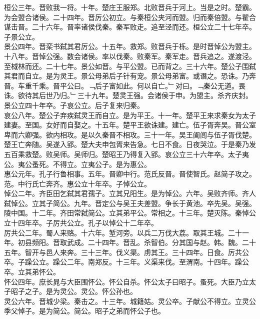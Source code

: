 \documentclass{zhvt-classic}
\begin{document}
\hspace*{2em}桓公三年。晋败我一将。十年。楚庄王服郑。北败晋兵于河上。当是之时。楚霸。为会盟合诸侯。二十四年。晋厉公初立。与秦桓公夹河而盟。归而秦倍盟。与翟合谋击晋。二十六年。晋率诸侯伐秦。秦军败走。追至泾而还。桓公立二十七年卒。子景公立。\\
\hspace*{2em}景公四年。晋栾书弑其君厉公。十五年。救郑。败晋兵于栎。是时晋悼公为盟主。十八年。晋悼公强。数会诸侯。率以伐秦。败秦军。秦军走。晋兵追之。遂渡泾。至棫林而还。二十七年。景公如晋。与平公盟。已而背之。三十六年。楚公子围弑其君而自立。是为灵王。景公母弟后子针有宠。景公母弟富。或谮之。恐诛。乃奔晋。车重千乘。晋平公曰。﹁后子富如此。何以自亡。﹂对曰。﹁秦公无道。畏诛。欲待其后世乃归。﹂三十九年。楚灵王强。会诸侯于申。为盟主。杀齐庆封。景公立四十年卒。子哀公立。后子复来归秦。\\
\hspace*{2em}哀公八年。楚公子弃疾弑灵王而自立。是为平王。十一年。楚平王来求秦女为太子建妻。至国。女好而自娶之。十五年。楚平王欲诛建。建亡。伍子胥奔吴。晋公室卑而六卿强。欲内相攻。是以久秦晋不相攻。三十一年。吴王阖闾与伍子胥伐楚。楚王亡奔随。吴遂入郢。楚大夫申包胥来告急。七日不食。日夜哭泣。于是秦乃发五百乘救楚。败吴师。吴师归。楚昭王乃得复入郢。哀公立三十六年卒。太子夷公。夷公蚤死。不得立。立夷公子。是为惠公。\\
\hspace*{2em}惠公元年。孔子行鲁相事。五年。晋卿中行。范氏反晋。晋使智氏。赵简子攻之。范。中行氏亡奔齐。惠公立十年卒。子悼公立。\\
\hspace*{2em}悼公二年。齐臣田乞弑其君孺子。立其兄阳生。是为悼公。六年。吴败齐师。齐人弑悼公。立其子简公。九年。晋定公与吴王夫差盟。争长于黄池。卒先吴。吴强。陵中国。十二年。齐田常弑简公。立其弟平公。常相之。十三年。楚灭陈。秦悼公立十四年卒。子厉共公立。孔子以悼公十二年卒。\\
\hspace*{2em}厉共公二年。蜀人来赂。十六年。堑河旁。以兵二万伐大荔。取其王城。二十一年。初县频阳。晋取武成。二十四年。晋乱。杀智伯。分其国与赵。韩。魏。二十五年。智开与邑人来奔。三十三年。伐义渠。虏其王。三十四年。日食。厉共公卒。子躁公立。躁公二年。南郑反。十三年。义渠来伐。至渭南。十四年。躁公卒。立其弟怀公。\\
\hspace*{2em}怀公四年。庶长晁与大臣围怀公。怀公自杀。怀公太子曰昭子。蚤死。大臣乃立太子昭子之子。是为灵公。灵公。怀公孙也。\\
\hspace*{2em}灵公六年。晋城少梁。秦击之。十三年。城籍姑。灵公卒。子献公不得立。立灵公季父悼子。是为简公。简公。昭子之弟而怀公子也。\\
\end{document}
